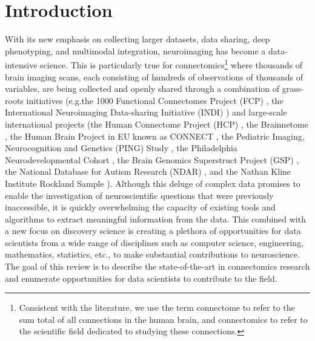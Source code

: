 \documentclass{bmcart}
\begin{document}
\begin{frontmatter}
\begin{abstractbox}
\begin{keyword}
\end{keyword}


\end{abstractbox}
%

\end{frontmatter}

\section{Introduction}

With its new emphasis on collecting larger datasets, data sharing, deep phenotyping, and multimodal integration, neuroimaging has become a data-intensive science. This is particularly true for connectomics\footnote{Consistent with the literature, we use the term connectome to refer to the sum total of all connections in the human brain, and connectomics to refer to the scientific field dedicated to studying these connections.} where thousands of brain imaging scans, each consisting of hundreds of observations of thousands of variables, are being collected and openly shared through a combination of grass-roots initiatives (e.g.the 1000 Functional Connectomes Project (FCP) \cite{Biswal2010}, the International Neuroimaging Data-sharing Initiative (INDI) \cite{Mennes2013}) and large-scale international projects (the Human Connectome Project (HCP) \cite{RosenHCP2010,VanEssen2012}, the Brainnetome \cite{Jiang2013}, the Human Brain Project in EU known as CONNECT \cite{Assaf2013}, the Pediatric Imaging, Neurocognition and Genetics (PING) Study \cite{JerniganPING}, the Philadelphia Neurodevelopmental Cohort \cite{Satterthwaite2014},  the Brain Genomics Superstruct Project (GSP) \cite{BucknerGSP2014}, the National Database for Autism Research (NDAR) \cite{NDAR}, and the Nathan Kline Institute Rockland Sample \cite{Nooner2012}). Although this deluge of complex data promises to enable the investigation of neuroscientific questions that were previously inaccessible, it is quickly overwhelming the capacity of existing tools and algorithms to extract meaningful information from the data. This combined with a new focus on discovery science is creating a plethora of opportunities for data scientists from a wide range of disciplines such as computer science, engineering, mathematics, statistics, etc., to make substantial contributions to neuroscience. The goal of this review is to describe the state-of-the-art in connectomics research and enumerate opportunities for data scientists to contribute to the field.
\end{document}
